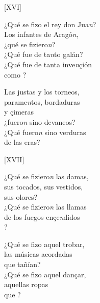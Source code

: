\documentclass[11pt,a4paper,twoside]{article}
\begin{document}
\begin{center}
	[XVI]
\end{center}
\pstart
¿Qué se fizo el rey don Jua\textit{n}?\\
Los infantes de Aragó\textit{n},\\
¿qué se fiziero\textit{n}?\\
¿Qué fue de ta\textit{n}to galán?\\
¿Qué fue de tanta inve\textit{n}çión\\
como ?\par
Las justas y los torneos,\\
parame\textit{n}tos, bordaduras\\
y çimeras\\
¿fuero\textit{n} sino devaneos?\\
¿Qué fuero\textit{n} sino verduras\\
de las eras?\par
\pend

\begin{center}
	[XVII]
\end{center}
\pstart
¿Qué se fiziero\textit{n} las damas,\\
sus tocados, sus vestidos,\\
sus olores?\\
¿Qué se fiziero\textit{n} las llamas\\
de los fuegos ençe\textit{n}didos\\
?\par
¿Qué se fizo aquel trobar,\\
las músicas acordadas\\
que tañían?\\
¿Qué se fizo aquel dançar,\\
aquellas ropas \\
que ?\par
\pend
\end{document}
